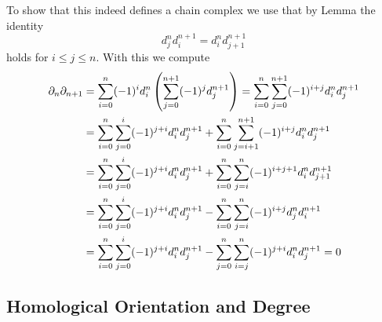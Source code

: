 	To show that this indeed defines a chain complex we use that by Lemma  the identity
	\begin{equation*}
		d_j^nd_i^{n+1} = d_i^nd_{j+1}^{n+1}
	\end{equation*}
	holds for $i \leq j \leq n$. With this we compute
	\begin{align*}
		\partial_n\partial_{n+1} &= \sum \limits_{i=0}^n(-1)^i d_i^n \left(\sum \limits_{j=0}^{n+1}(-1)^j d_j^{n+1}\right)
		= \sum \limits_{i=0}^n \sum \limits_{j=0}^{n+1}(-1)^{i+j}d_i^nd_j^{n+1}\\
		&=\sum\limits_{i=0}^n\sum\limits_{j=0}^{i}(-1)^{j+i}d_i^nd_j^{n+1} + \sum\limits_{i=0}^n\sum\limits_{j=i+1}^{n+1}(-1)^{i+j}d_i^nd_j^{n+1}\\
		&=\sum\limits_{i=0}^n\sum\limits_{j=0}^{i}(-1)^{j+i}d_i^nd_j^{n+1} + \sum\limits_{i=0}^n\sum\limits_{j=i}^{n}(-1)^{i+j+1}d_i^nd_{j+1}^{n+1}\\
		&=\sum\limits_{i=0}^n\sum\limits_{j=0}^{i}(-1)^{j+i}d_i^nd_j^{n+1} - \sum\limits_{i=0}^n\sum\limits_{j=i}^{n}(-1)^{i+j}d_j^nd_i^{n+1}\\
		&=\sum\limits_{i=0}^n\sum\limits_{j=0}^{i}(-1)^{j+i}d_i^nd_j^{n+1} - \sum\limits_{j=0}^n\sum\limits_{i=j}^{n}(-1)^{j+i}d_i^nd_j^{n+1} = 0
	\end{align*}



	\subsection{Homological Orientation and Degree}
